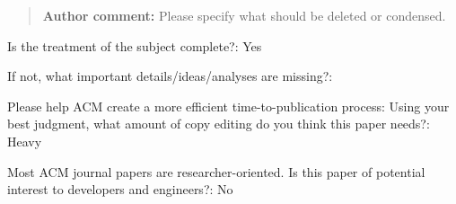 \documentclass[10pt]{article}
\newcommand{\authorcomment}[1]{\begin{quote}\textbf{Author comment:} #1\end{quote}}
\begin{document}
\authorcomment{Please specify what should be deleted or condensed.}
\begin{spverbatim}
Is the treatment of the subject complete?: Yes

If not, what important details/ideas/analyses are missing?: 

Please help ACM create a more efficient time-to-publication process: Using your best judgment, what amount of copy editing do you think this paper needs?: Heavy

Most ACM journal papers are researcher-oriented. Is this paper of potential interest to developers and engineers?: No
\end{spverbatim}
\end{document}
